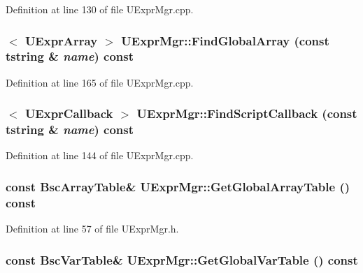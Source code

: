 Definition at line 130 of file UExprMgr.cpp.\hypertarget{class_u_expr_mgr_221fe16c42364455a19c5613c3f01ef4}{
\subsubsection[{FindGlobalArray}]{$<$ {\bf UExprArray} $>$ UExprMgr::FindGlobalArray (const {\bf tstring} \& {\em name}) const}}
\label{class_u_expr_mgr_221fe16c42364455a19c5613c3f01ef4}




Definition at line 165 of file UExprMgr.cpp.\hypertarget{class_u_expr_mgr_264f27c6ae13776fa159a1bcedbc8a3a}{
\subsubsection[{FindScriptCallback}]{$<$ {\bf UExprCallback} $>$ UExprMgr::FindScriptCallback (const {\bf tstring} \& {\em name}) const}}
\label{class_u_expr_mgr_264f27c6ae13776fa159a1bcedbc8a3a}




Definition at line 144 of file UExprMgr.cpp.\hypertarget{class_u_expr_mgr_e28c61caea41c0a88a11697475fcb2d2}{
\subsubsection[{GetGlobalArrayTable}]{\setlength{\rightskip}{0pt plus 5cm}const {\bf BscArrayTable}\& UExprMgr::GetGlobalArrayTable () const}}
\label{class_u_expr_mgr_e28c61caea41c0a88a11697475fcb2d2}




Definition at line 57 of file UExprMgr.h.\hypertarget{class_u_expr_mgr_66f13fd3cf7d28c7ac45dd8b88f28f47}{
\subsubsection[{GetGlobalVarTable}]{\setlength{\rightskip}{0pt plus 5cm}const {\bf BscVarTable}\& UExprMgr::GetGlobalVarTable () const}}
\label{class_u_expr_mgr_66f13fd3cf7d28c7ac45dd8b88f28f47}




